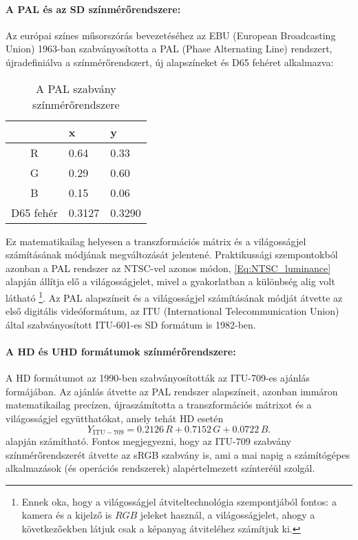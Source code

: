 \paragraph{A PAL és az SD színmérőrendszere:\\}
Az európai színes műsorszórás bevezetéséhez az EBU (European Broadcasting Union) 1963-ban szabványosította a PAL (Phase Alternating Line) rendszert, újradefiniálva a színmérőrendszert, új alapszíneket és D65 fehéret alkalmazva:
\begin{table}[h!]
\caption{A PAL szabvány színmérőrendszere}
\renewcommand*{\arraystretch}{1}
\label{tab:pal_colorimetry}
\begin{center}
\small\addtolength{\tabcolsep}{15pt}
    \begin{tabular}[h!]{ @{}c | | l | l @{} }%
		&   x  	&    y \\ \hline
    R   &  0.64 &  0.33 \\
    G   &  0.29 &  0.60  \\
    B   & 0.15 & 0.06\\
    D65 fehér     &  0.3127 & 0.3290 	  \\
    \end{tabular}
\end{center}
\end{table}
%
Ez matematikailag helyesen a transzformációs mátrix és a világosságjel számításának módjának megváltozását jelentené.
Praktikussági szempontokból azonban a PAL rendszer az NTSC-vel azonos módon, \eqref{Eq:NTSC_luminance} alapján állítja elő a világosságjelet, mivel a gyakorlatban a különbség alig volt látható \footnote{Ennek oka, hogy a világosságjel átviteltechnológia szempontjából fontos: a kamera és a kijelző is $RGB$ jeleket használ, a világosságjelet, ahogy a következőekben látjuk csak a képanyag átviteléhez számítjuk ki.}.
Az PAL alapszíneit és a világosságjel számításának módját átvette az első digitális videóformátum, az ITU (International Telecommunication Union) által szabványosított ITU-601-es SD formátum is 1982-ben.

\paragraph{A HD és UHD formátumok színmérőrendszere:\\}
A HD formátumot az 1990-ben szabványosították az ITU-709-es ajánlás formájában.
Az ajánlás átvette az PAL rendszer alapszíneit, azonban immáron matematikailag precízen, újraszámította a transzformációs mátrixot és a világosságjel együtthatókat, amely tehát HD esetén
\begin{equation}Y_{\mathrm{ITU}-709} = 
   0.2126\,R + 0.7152\,G + 0.0722\,B. 
\label{Eq:NTSC_luminance}
\end{equation}
alapján számítható.
Fontos megjegyezni, hogy az ITU-709 szabvány színmérőrendszerét átvette az sRGB szabvány is, ami a mai napig a számítógépes alkalmazások (és operációs rendszerek) alapértelmezett színteréül szolgál.

